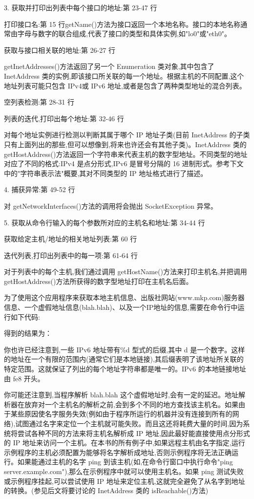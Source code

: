 		3. 获取并打印出列表中每个接口的地址:第 23-47 行

		打印接口名:第 15 行getName()方法为接口返回一个本地名称。接口的本地名称通常由字母与数字的联合组成,代表了接口的类型和具体实例,如"lo0"或"eth0"。

		获取与接口相关联的地址:第 26-27 行

		getInetAddresses()方法返回了另一个 Enumeration 类对象,其中包含了 InetAddress 类的实例,即该接口所关联的每一个地址。根据主机的不同配置,这个地址列表可能只包含 IPv4或 IPv6 地址,或者是包含了两种类型地址的混合列表。

		空列表检测:第 28-31 行

		列表的迭代,打印出每个地址:第 32-46 行

		对每个地址实例进行检测以判断其属于哪个 IP 地址子类(目前 InetAddress 的子类只有上面列出的那些,但可以想像到,将来也许还会有其他子类)。InetAddress 类的getHostAddress()方法返回一个字符串来代表主机的数字型地址。不同类型的地址对应了不同的格式:IPv4 是点分形式,IPv6 是冒号分隔的 16 进制形式。参考下文中的"字符串表示法"概要,其对不同类型的 IP 地址格式进行了描述。

		4. 捕获异常:第 49-52 行

		对 getNetworkInterfaces()方法的调用将会抛出 SocketException 异常。

		5. 获取从命令行输入的每个参数所对应的主机名和地址:第 34-44 行

		获取给定主机/地址的相关地址列表:第 60 行

		迭代列表,打印出列表中的每一项:第 61-64 行

		对于列表中的每个主机,我们通过调用 getHostName()方法来打印主机名,并把调用getHostAddress()方法所获得的数字型地址打印在主机名后面。

		为了使用这个应用程序来获取本地主机信息、出版社网站(www.mkp.com)服务器信息、一个虚假地址信息(blah.blah)、以及一个IP地址的信息,需要在命令行中运行如下代码:

		

		得到的结果为：

		

		你也许已经注意到,一些 IPv6 地址带有\%d 型式的后缀,其中 d 是一个数字。这样的地址在一个有限的范围内(通常它们是本地链接),其后缀表明了该地址所关联的特定范围。这就保证了列出的每个地址字符串都是唯一的。IPv6 的本地链接地址由 fe8 开头。

		你可能还注意到,当程序解析 blah.blah 这个虚假地址时,会有一定的延迟。地址解析器在放弃对一个主机名的解析之前,会到多个不同的地方查找该主机名。如果由于某些原因使名字服务失效(例如由于程序所运行的机器并没有连接到所有的网络),试图通过名字来定位一个主机就可能失败。而且这还将耗费大量的时间,因为系统将尝试各种不同的方法来将主机名解析成 IP 地址,因此最好能直接使用点分形式的 IP 地址来访问一个主机。在本书的所有例子中,如果远程主机由名字指定,运行示例程序的主机必须配置为能够将名字解析成地址,否则示例程序将无法正确运行。如果能通过主机的名字 ping 到该主机(如,在命令行窗口中执行命令"ping server.example.com"),那么在示例程序中就可以使用主机名。如果 ping 测试失败或示例程序挂起,可以尝试使用 IP 地址来定位主机,这就完全避免了从名字到地址的转换。(参见后文将要讨论的 InetAddress 类的 isReachable()方法) 

